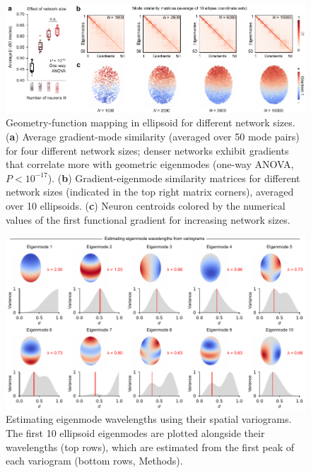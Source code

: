 \documentclass{article}
\begin{document}
\begin{figure}[t]
    \centering
    \includegraphics[width=1.0\linewidth]{figures/supp_network_size.pdf}
    \caption{Geometry-function mapping in ellipsoid for different network sizes. (\textbf{a}) Average gradient-mode similarity (averaged over 50 mode pairs) for four different network sizes; denser networks exhibit gradients that correlate more with geometric eigenmodes (one-way ANOVA, $P<10^{-17}$). (\textbf{b}) Gradient-eigenmode similarity matrices for different network sizes (indicated in the top right matrix corners), averaged over 10 ellipsoids. (\textbf{c}) Neuron centroids colored by the numerical values of the first functional gradient for increasing network sizes.}
    \label{supp_network_size}
\end{figure}

\newpage

\begin{figure}[t]
    \centering
    \includegraphics[width=1.0\linewidth]{figures/supp_variograms.pdf}
    \caption{Estimating eigenmode wavelengths using their spatial variograms. The first 10 ellipsoid eigenmodes are plotted alongside their wavelengths (top rows), which are estimated from the first peak of each variogram (bottom rows, Methods).}
    \label{supp_variograms}
\end{figure}
\end{document}
